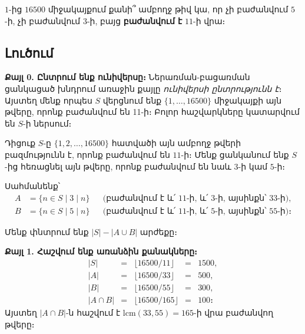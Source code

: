 \documentclass[12pt, a4paper]{article}
\begin{document}
\begin{theorybox}
\begin{center}
\end{center}
\end{theorybox}

\begin{problembox}
$1$-ից $16500$ միջակայքում քանի՞ ամբողջ թիվ կա, որ չի բաժանվում $5$-ի, չի բաժանվում $3$-ի, բայց \textbf{բաժանվում է} $11$-ի վրա։
\end{problembox}

\subsection*{Լուծում}

\textbf{Քայլ 0. Ընտրում ենք ունիվերսը։}\; Ներառման-բացառման ցանկացած խնդրում առաջին քայլը \emph{ունիվերսի ընտրությունն է}։ Այստեղ մենք որպես $S$ վերցնում ենք $\{1, \ldots, 16500\}$ միջակայքի այն թվերը, որոնք բաժանվում են 11-ի։ Բոլոր հաշվարկները կատարվում են $S$-ի ներսում։

\medskip
Դիցուք $S$-ը $\{1, 2, \ldots, 16500\}$ հատվածի այն ամբողջ թվերի բազմությունն է, որոնք բաժանվում են $11$-ի։ Մենք ցանկանում ենք $S$-ից հեռացնել այն թվերը, որոնք բաժանվում են նաև $3$-ի կամ $5$-ի։

Սահմանենք՝
\begin{align*}
  A &= \{n \in S \mid 3 \mid n\}
      &&\text{(բաժանվում է և՛ 11-ի, և՛ 3-ի, այսինքն՝ 33-ի)}, \\
  B &= \{n \in S \mid 5 \mid n\}
      &&\text{(բաժանվում է և՛ 11-ի, և՛ 5-ի, այսինքն՝ 55-ի)}։
\end{align*}

Մենք փնտրում ենք $|S| - |A \cup B|$ արժեքը։

\textbf{Քայլ 1. Հաշվում ենք առանձին քանակները։}
\[
\renewcommand{\arraystretch}{1.3}
\begin{array}{rclcl}
  |S| &=& \lfloor 16500/11 \rfloor &=& 1500, \\
  |A| &=& \lfloor 16500/33 \rfloor &=& 500, \\
  |B| &=& \lfloor 16500/55 \rfloor &=& 300, \\
  |A \cap B| &=& \lfloor 16500/165 \rfloor &=& 100։
\end{array}
\]
Այստեղ $|A \cap B|$-ն հաշվում է $\text{lcm}(33,55) = 165$-ի վրա բաժանվող թվերը։
\end{document}
